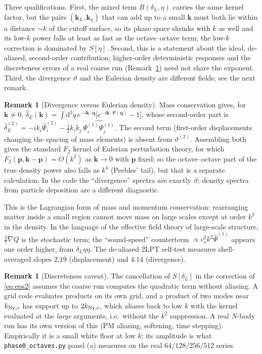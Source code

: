 \documentclass[11pt]{article}
\theoremstyle{definition}
\newtheorem{remark}[proposition]{Remark}
\newcommand{\q}{\mathbf{q}}
\newcommand{\kk}{\mathbf{k}}
\newcommand{\dd}{\mathrm{d}}
\newcommand{\Ny}{{\rm Ny}}
\begin{document}
Three qualifications. First, the mixed term $B(\delta_L,\eta)$ carries the same kernel factor, but the pairs $(\kk_L,\kk_\eta)$ that can add up to a small $\kk$ must both lie within a distance $\sim k$ of the cutoff surface, so its phase space shrinks with $k$ as well and its low-$k$ power falls at least as fast as the octave--octave term; the low-$k$ correction is dominated by $S[\eta]$. Second, this is a statement about the ideal, de-aliased, second-order contribution; higher-order deterministic responses and the discreteness errors of a real coarse run (Remark~\ref{rem:disc}) need not share the exponent. Third, the divergence $\vartheta$ and the Eulerian density are different fields; see the next remark.

\begin{remark}[Divergence versus Eulerian density]\label{rem:density}
Mass conservation gives, for $\kk\neq0$, $\hat\delta_E(\kk)=\int\dd^3q\,e^{-i\kk\cdot\q}\big[e^{-i\kk\cdot\Psi(\q)}-1\big]$, whose second-order part is
$\hat\delta^{(2)}_E=-ik_i\hat\Psi^{(2)}_i-\tfrac12k_ik_j\,\widehat{\Psi^{(1)}_i\Psi^{(1)}_j}$. The second term (first-order displacements changing the spacing of mass elements) is absent from $\vartheta^{(2)}$. Assembling both gives the standard $F_2$ kernel of Eulerian perturbation theory, for which $F_2(\mathbf p,\kk-\mathbf p)=O(k^2)$ as $\kk\to0$ with $\mathbf p$ fixed; so the octave--octave part of the true density power also falls as $k^4$ (Peebles' tail), but that is a separate calculation. In the code the ``divergence'' spectra are exactly $\vartheta$; density spectra from particle deposition are a different diagnostic.
\end{remark}

This is the Lagrangian form of mass and momentum conservation: rearranging matter inside a small region cannot move mass on large scales except at order $k^2$ in the density. In the language of the effective field theory of large-scale structure, $\frac37\nabla Q$ is the stochastic term; the ``sound-speed'' counterterm $\propto c_s^2k^2\hat\Psi^{(1)}$ appears one order higher, from $\delta_L\eta\eta$. The de-aliased 2LPT self-test measures shell-averaged slopes $2.19$ (displacement) and $4.14$ (divergence).

\begin{remark}[Discreteness caveat]\label{rem:disc}
The cancellation of $S[\delta_L]$ in the correction of \eqref{eq:eps2} assumes the coarse run computes the quadratic term without aliasing. A grid code evaluates products on its own grid, and a product of two modes near $k_{\Ny,c}$ has support up to $2k_{\Ny,c}$, which aliases back to low $k$ with the kernel evaluated at the \emph{large} arguments, i.e.\ without the $k^2$ suppression. A real $N$-body run has its own version of this (PM aliasing, softening, time stepping). Empirically it is a small white floor at low $k$; its amplitude is what \texttt{phase0\_octaves.py} panel (a) measures on the real $64/128/256/512$ series.
\end{remark}
\end{document}

